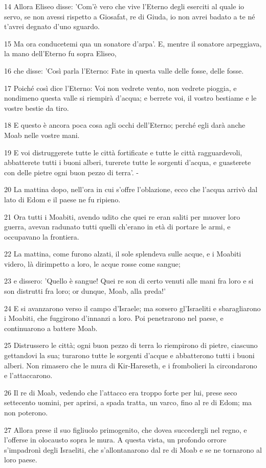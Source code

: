 \par 14 Allora Eliseo disse: 'Com'è vero che vive l'Eterno degli eserciti al quale io servo, se non avessi rispetto a Giosafat, re di Giuda, io non avrei badato a te né t'avrei degnato d'uno sguardo.
\par 15 Ma ora conducetemi qua un sonatore d'arpa'. E, mentre il sonatore arpeggiava, la mano dell'Eterno fu sopra Eliseo,
\par 16 che disse: 'Così parla l'Eterno: Fate in questa valle delle fosse, delle fosse.
\par 17 Poiché così dice l'Eterno: Voi non vedrete vento, non vedrete pioggia, e nondimeno questa valle si riempirà d'acqua; e berrete voi, il vostro bestiame e le vostre bestie da tiro.
\par 18 E questo è ancora poca cosa agli occhi dell'Eterno; perché egli darà anche Moab nelle vostre mani.
\par 19 E voi distruggerete tutte le città fortificate e tutte le città ragguardevoli, abbatterete tutti i buoni alberi, turerete tutte le sorgenti d'acqua, e guasterete con delle pietre ogni buon pezzo di terra'. -
\par 20 La mattina dopo, nell'ora in cui s'offre l'oblazione, ecco che l'acqua arrivò dal lato di Edom e il paese ne fu ripieno.
\par 21 Ora tutti i Moabiti, avendo udito che quei re eran saliti per muover loro guerra, avevan radunato tutti quelli ch'erano in età di portare le armi, e occupavano la frontiera.
\par 22 La mattina, come furono alzati, il sole splendeva sulle acque, e i Moabiti videro, là dirimpetto a loro, le acque rosse come sangue;
\par 23 e dissero: 'Quello è sangue! Quei re son di certo venuti alle mani fra loro e si son distrutti fra loro; or dunque, Moab, alla preda!'
\par 24 E si avanzarono verso il campo d'Israele; ma sorsero gl'Israeliti e sbaragliarono i Moabiti, che fuggirono d'innanzi a loro. Poi penetrarono nel paese, e continuarono a battere Moab.
\par 25 Distrussero le città; ogni buon pezzo di terra lo riempirono di pietre, ciascuno gettandovi la sua; turarono tutte le sorgenti d'acque e abbatterono tutti i buoni alberi. Non rimasero che le mura di Kir-Hareseth, e i frombolieri la circondarono e l'attaccarono.
\par 26 Il re di Moab, vedendo che l'attacco era troppo forte per lui, prese seco settecento uomini, per aprirsi, a spada tratta, un varco, fino al re di Edom; ma non poterono.
\par 27 Allora prese il suo figliuolo primogenito, che dovea succedergli nel regno, e l'offerse in olocausto sopra le mura. A questa vista, un profondo orrore s'impadronì degli Israeliti, che s'allontanarono dal re di Moab e se ne tornarono al loro paese.

